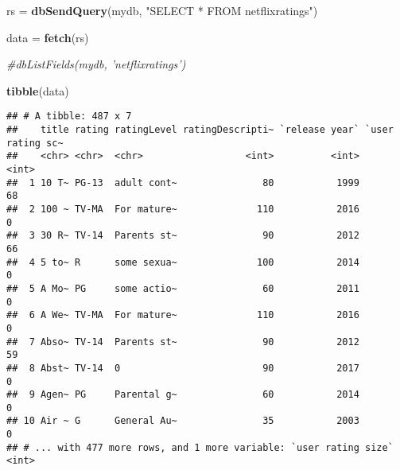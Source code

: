 \documentclass[
]{article}
\newenvironment{Shaded}{\begin{snugshade}}{\end{snugshade}}
\newcommand{\CommentTok}[1]{\textcolor[rgb]{0.56,0.35,0.01}{\textit{#1}}}
\newcommand{\KeywordTok}[1]{\textcolor[rgb]{0.13,0.29,0.53}{\textbf{#1}}}
\newcommand{\NormalTok}[1]{#1}
\newcommand{\StringTok}[1]{\textcolor[rgb]{0.31,0.60,0.02}{#1}}
\begin{document}
\begin{Shaded}
\begin{Highlighting}[]
\NormalTok{rs =}\StringTok{ }\KeywordTok{dbSendQuery}\NormalTok{(mydb, }\StringTok{"SELECT * FROM netflixratings"}\NormalTok{)}

\NormalTok{data =}\StringTok{ }\KeywordTok{fetch}\NormalTok{(rs)}

\CommentTok{#dbListFields(mydb, 'netflixratings')}

\KeywordTok{tibble}\NormalTok{(data)}
\end{Highlighting}
\end{Shaded}

\begin{verbatim}
## # A tibble: 487 x 7
##    title rating ratingLevel ratingDescripti~ `release year` `user rating sc~
##    <chr> <chr>  <chr>                  <int>          <int>            <int>
##  1 10 T~ PG-13  adult cont~               80           1999               68
##  2 100 ~ TV-MA  For mature~              110           2016                0
##  3 30 R~ TV-14  Parents st~               90           2012               66
##  4 5 to~ R      some sexua~              100           2014                0
##  5 A Mo~ PG     some actio~               60           2011                0
##  6 A We~ TV-MA  For mature~              110           2016                0
##  7 Abso~ TV-14  Parents st~               90           2012               59
##  8 Abst~ TV-14  0                         90           2017                0
##  9 Agen~ PG     Parental g~               60           2014                0
## 10 Air ~ G      General Au~               35           2003                0
## # ... with 477 more rows, and 1 more variable: `user rating size` <int>
\end{verbatim}
\end{document}
